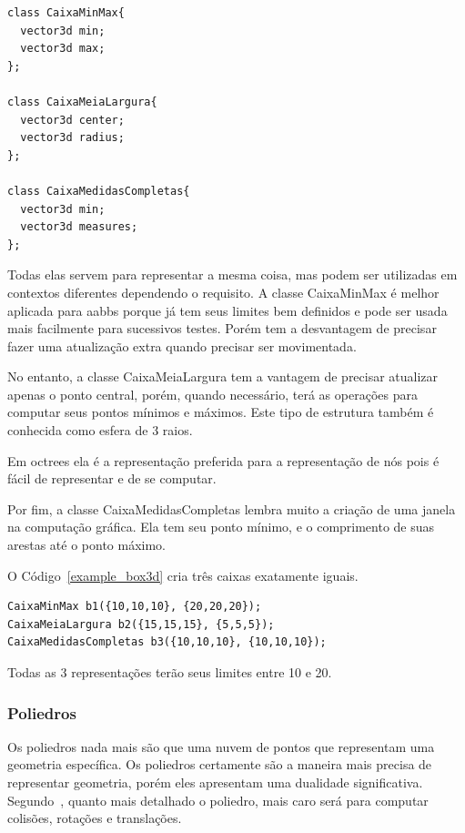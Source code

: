 \begin{lstlisting}[frame=single,caption=Representação de caixa ponto mínimo e máximo\label{code:box3d}]
class CaixaMinMax{
  vector3d min;
  vector3d max;
};

class CaixaMeiaLargura{
  vector3d center;
  vector3d radius;
};

class CaixaMedidasCompletas{
  vector3d min;
  vector3d measures;
};
\end{lstlisting}

Todas elas servem para representar a mesma coisa, mas podem ser utilizadas em
contextos diferentes dependendo o requisito. A classe CaixaMinMax é melhor aplicada para aabbs porque já tem seus limites bem definidos e pode ser usada mais facilmente para sucessivos testes. Porém tem a desvantagem de precisar fazer uma atualização extra quando precisar ser movimentada.

No entanto, a classe CaixaMeiaLargura tem a vantagem de precisar atualizar apenas o ponto
central, porém, quando necessário, terá as operações para computar seus pontos
mínimos e máximos. Este tipo de estrutura também é conhecida como esfera de 3
raios.

Em octrees ela é a representação preferida para a representação de nós
pois é fácil de representar e de se computar.

Por fim, a classe CaixaMedidasCompletas lembra muito a criação de uma janela na computação gráfica. Ela tem seu
ponto mínimo, e o comprimento de suas arestas até o ponto máximo.

O Código~\ref{example_box3d} cria três caixas exatamente iguais.

\begin{lstlisting}[frame=single,caption=Código de exemplo de criação de 3 caixas\label{example_box3d}]
CaixaMinMax b1({10,10,10}, {20,20,20});
CaixaMeiaLargura b2({15,15,15}, {5,5,5});
CaixaMedidasCompletas b3({10,10,10}, {10,10,10});
\end{lstlisting}

Todas as 3 representações terão seus limites entre 10 e 20.


\subsubsection{Poliedros}

Os poliedros nada mais são que uma nuvem de pontos que representam uma
geometria específica. Os poliedros certamente são a maneira mais precisa de
representar geometria, porém eles apresentam uma dualidade significativa. Segundo~, quanto mais
detalhado o poliedro, mais caro será para computar colisões, rotações e
translações.

